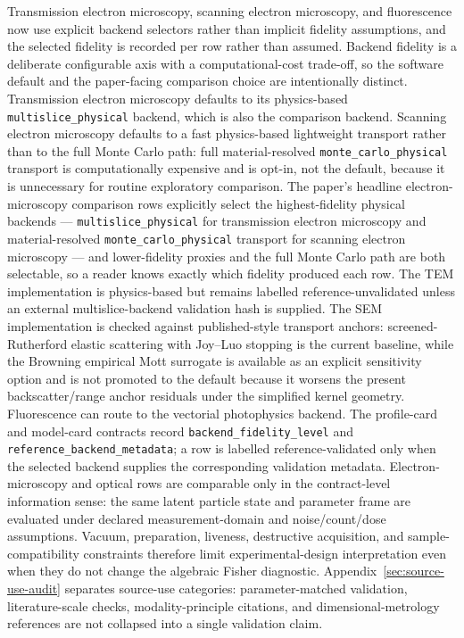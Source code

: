 Transmission electron microscopy, scanning electron microscopy, and fluorescence now use explicit backend selectors rather than implicit fidelity assumptions, and the selected fidelity is recorded per row rather than assumed. Backend fidelity is a deliberate configurable axis with a computational-cost trade-off, so the software default and the paper-facing comparison choice are intentionally distinct. Transmission electron microscopy defaults to its physics-based \texttt{multislice\_physical} backend, which is also the comparison backend. Scanning electron microscopy defaults to a fast physics-based lightweight transport rather than to the full Monte Carlo path: full material-resolved \texttt{monte\_carlo\_physical} transport is computationally expensive and is opt-in, not the default, because it is unnecessary for routine exploratory comparison. The paper's headline electron-microscopy comparison rows explicitly select the highest-fidelity physical backends --- \texttt{multislice\_physical} for transmission electron microscopy and material-resolved \texttt{monte\_carlo\_physical} transport for scanning electron microscopy --- and lower-fidelity proxies and the full Monte Carlo path are both selectable, so a reader knows exactly which fidelity produced each row. The TEM implementation is physics-based but remains labelled reference-unvalidated unless an external multislice-backend validation hash is supplied. The SEM implementation is checked against published-style transport anchors: screened-Rutherford elastic scattering with Joy--Luo stopping is the current baseline, while the Browning empirical Mott surrogate is available as an explicit sensitivity option and is not promoted to the default because it worsens the present backscatter/range anchor residuals under the simplified kernel geometry. Fluorescence can route to the vectorial photophysics backend. The profile-card and model-card contracts record \texttt{backend\_fidelity\_level} and \texttt{reference\_backend\_metadata}; a row is labelled reference-validated only when the selected backend supplies the corresponding validation metadata. Electron-microscopy and optical rows are comparable only in the contract-level information sense: the same latent particle state and parameter frame are evaluated under declared measurement-domain and noise/count/dose assumptions. Vacuum, preparation, liveness, destructive acquisition, and sample-compatibility constraints therefore limit experimental-design interpretation even when they do not change the algebraic Fisher diagnostic. Appendix~\ref{sec:source-use-audit} separates source-use categories: parameter-matched validation, literature-scale checks, modality-principle citations, and dimensional-metrology references are not collapsed into a single validation claim.

